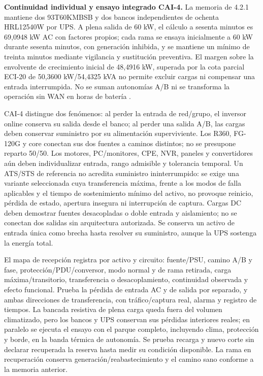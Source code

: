 \textbf{Continuidad individual y ensayo integrado CAI-4.}\label{sec:sd4-autonomia-cai4}
La memoria de 4.2.1 mantiene dos 93T60KMBSB y dos bancos independientes de ochenta HRL12540W por UPS. A plena salida de 60 kW, el cálculo a sesenta minutos es 69,0948 kW AC con factores propios; cada rama se ensaya inicialmente a 60 kW durante sesenta minutos, con generación inhibida, y se mantiene un mínimo de treinta minutos mediante vigilancia y sustitución preventiva. El margen sobre la envolvente de crecimiento inicial de 48,4916 kW, superada por la cota parcial ECI-20 de 50,3600 kW/54,4325 kVA no permite excluir cargas ni compensar una entrada interrumpida. No se suman autonomías A/B ni se transforma la operación sin WAN en horas de batería \parencites{p7-eaton-93t-guia}{csbHRL12540WRA260131}[RT-06.07, p.~15]{pucv-transversal}.

CAI-4 distingue dos fenómenos: al perder la entrada de red/grupo, el inversor online conserva su salida desde el banco; al perder una salida A/B, las cargas deben conservar suministro por su alimentación superviviente. Los R360, FG-120G y core conectan sus dos fuentes a caminos distintos; no se presupone reparto 50/50. Los motores, PC/monitores, CPE, NVR, paneles y convertidores aún deben individualizar entrada, rango admisible y tolerancia temporal. Un ATS/STS de referencia no acredita suministro ininterrumpido: se exige una variante seleccionada cuya transferencia máxima, frente a los modos de falla aplicables y el tiempo de sostenimiento mínimo del activo, no provoque reinicio, pérdida de estado, apertura insegura ni interrupción de captura. Cargas DC deben demostrar fuentes desacopladas o doble entrada y aislamiento; no se conectan dos salidas sin arquitectura autorizada. Se conserva un activo de entrada única como brecha hasta resolver su suministro, aunque la UPS sostenga la energía total.

El mapa de recepción registra por activo y circuito: fuente/PSU, camino A/B y fase, protección/PDU/conversor, modo normal y de rama retirada, carga máxima/transitorio, transferencia o desacoplamiento, continuidad observada y efecto funcional. Prueba la pérdida de entrada AC y de salida por separado, y ambas direcciones de transferencia, con tráfico/captura real, alarma y registro de tiempos. La bancada resistiva de plena carga queda fuera del volumen climatizado, pero los bancos y UPS conservan sus pérdidas interiores reales; en paralelo se ejecuta el ensayo con el parque completo, incluyendo clima, protección y borde, en la banda térmica de autonomía. Se prueba recarga y nuevo corte sin declarar recuperada la reserva hasta medir su condición disponible. La rama en recuperación conserva generación/reabastecimiento y el camino sano conforme a la memoria anterior.


